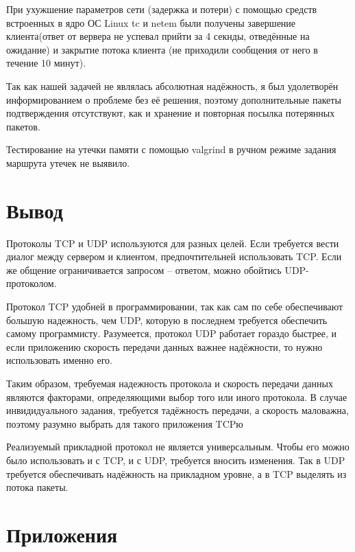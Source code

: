 \documentclass[a4paper]{article}
\begin{document}
При ухужшение параметров сети (задержка и потери) с помощью средств встроенных в ядро ОС Linux tc и netem были получены завершение клиента(ответ от вервера не успевал прийти за 4 секнды, отведённые на ожидание) и закрытие потока клиента (не приходили сообщения от него в течение 10 минут).

Так как нашей задачей не являлась абсолютная надёжность, я был удолетворён информированием о проблеме без её решения, поэтому дополнительные пакеты подтверждения отсутствуют, как и хранение и повторная посылка потерянных пакетов.

Тестирование на утечки памяти с помощью valgrind в ручном режиме задания маршрута утечек не выявило.
\section{ Вывод}
Протоколы TCP и UDP используются для разных целей. Если требуется вести диалог между сервером и клиентом, предпочтительней использовать TCP. Если же общение ограничивается запросом – ответом, можно обойтись UDP-протоколом.

Протокол TCP удобней в программировании, так как сам по себе обеспечивают большую надежность, чем UDP, которую в последнем требуется обеспечить самому программисту. Разумеется, протокол UDP работает гораздо быстрее, и если приложению скорость передачи данных важнее надёжности, то нужно использовать именно его.
 
Таким образом,  требуемая надежность протокола и скорость передачи данных являются факторами, определяющими выбор того или иного протокола. В случае инвидидуального задания, требуется тадёжность передачи, а скорость маловажна, поэтому разумно выбрать для такого приложения TCPю

Реализуемый прикладной протокол не является универсальным. Чтобы его можно было использовать и с TCP, и с UDP, требуется вносить изменения. Так в UDP требуется обеспечивать надёжность на прикладном уровне, а в TCP выделять из потока пакеты.
\newpage
\section{Приложения}

















\end{document}
